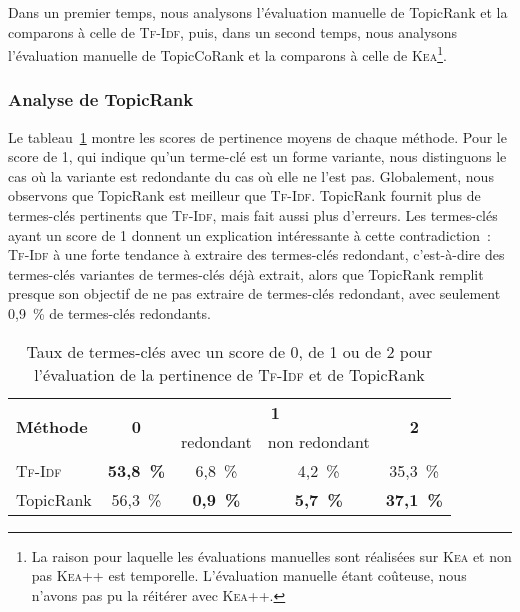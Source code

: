       Dans un premier temps, nous analysons l'évaluation manuelle de TopicRank
      et la comparons à celle de \textsc{Tf-Idf}, puis, dans un second temps,
      nous analysons l'évaluation manuelle de TopicCoRank et la comparons à
      celle de \textsc{Kea}\footnote{La raison pour laquelle les évaluations
      manuelles sont réalisées sur \textsc{Kea} et non pas \textsc{Kea++} est
      temporelle. L'évaluation manuelle étant coûteuse, nous n'avons pas pu
      la réitérer avec \textsc{Kea++}.}.

      \subsubsection{Analyse de TopicRank}
      \label{subsubsec:main-domain_specific_keyphrase_annotation-manual_evaluation-analysis-topicrank}
        Le
        tableau~\ref{tab:main-automatic_evaluation_of_keyphrase_annotation-results-topicrank-pertinence_score_ratio}
        montre les scores de pertinence moyens de chaque méthode. Pour le score
        de 1, qui indique qu'un terme-clé est un forme variante, nous
        distinguons le cas où la variante est redondante du cas où elle ne l'est
        pas. Globalement, nous observons que TopicRank est meilleur que
        \textsc{Tf-Idf}. TopicRank fournit plus de termes-clés pertinents que
        \textsc{Tf-Idf}, mais fait aussi plus d'erreurs. Les termes-clés ayant
        un score de 1 donnent un explication intéressante à cette
        contradiction~: \textsc{Tf-Idf} à une forte tendance à extraire des
        termes-clés redondant, c'est-à-dire des termes-clés variantes de
        termes-clés déjà extrait, alors que TopicRank remplit presque son
        objectif de ne pas extraire de termes-clés redondant, avec seulement
        0,9~\% de termes-clés redondants.
        \begin{table}[h!]
          \centering
          \begin{tabular}{l|c|c|c|c}
            \toprule
            \multirow{2}{*}{\textbf{Méthode}} & \multirow{2}{*}{\textbf{0}} & \multicolumn{2}{c|}{\textbf{1}} & \multirow{2}{*}{\textbf{2}}\\
            \cline{3-4}
            & & \multicolumn{1}{p{.175\linewidth}|}{\centering{}redondant} & \multicolumn{1}{p{.175\linewidth}|}{\centering{}non redondant} &\\
            \hline
            \textsc{Tf-Idf} & \textbf{53,8~\%} & 6,8~\% & 4,2~\% & 35,3~\%\\
            TopicRank & 56,3~\% & \textbf{0,9~\%} & \textbf{5,7~\%} & \textbf{37,1~\%}\\
            \bottomrule
          \end{tabular}
          \caption{Taux de termes-clés avec un score de 0, de 1 ou de 2 pour
                   l'évaluation de la pertinence de \textsc{Tf-Idf} et de
                   TopicRank
                   \label{tab:main-automatic_evaluation_of_keyphrase_annotation-results-topicrank-pertinence_score_ratio}}
        \end{table}

